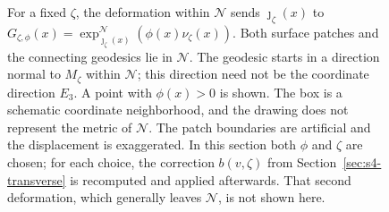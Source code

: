 \documentclass[a4paper,11pt,oneside,reqno]{amsart}
\numberwithin{equation}{section}
\theoremstyle{definition}
\begin{document}
\begin{figure}[htbp]
    \endgroup
    \caption{For a fixed $\zeta$, the deformation within $\mathcal N$
    sends $\jmath_\zeta(x)$ to
    $G_{\zeta,\phi}(x)=\exp^{\mathcal N}_{\jmath_\zeta(x)}
    (\phi(x)\nu_\zeta(x))$. Both surface patches and the connecting
    geodesics lie in $\mathcal N$. The geodesic starts in a direction
    normal to $M_\zeta$ within $\mathcal N$; this direction need not
    be the coordinate direction $E_3$. A point with $\phi(x)>0$ is
    shown. The box is a schematic coordinate neighborhood, and
    the drawing does not represent the metric of $\mathcal N$.
    The patch boundaries are artificial and the displacement is
    exaggerated. In this section both $\phi$ and $\zeta$ are chosen;
    for each choice, the correction $b(v,\zeta)$ from
    Section~\ref{sec:s4-transverse} is recomputed and applied
    afterwards. That second deformation, which generally leaves
    $\mathcal N$, is not shown here.}
    \label{fig:s4-internal-displacement}
\end{figure}
\end{document}
